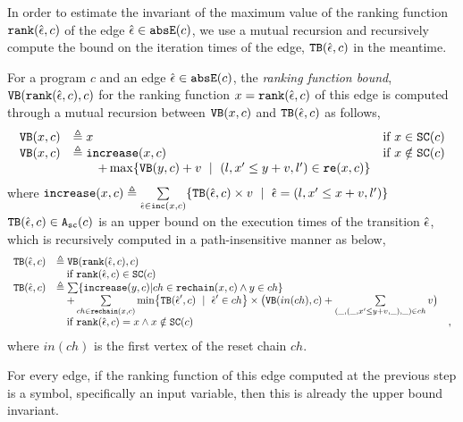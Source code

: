  In order to estimate the invariant of the maximum value of the ranking function $\mathtt{rank}(\hat{\mathtt{\epsilon}{}}, c)$
 of the edge $\hat{\mathtt{\epsilon}{}} \in \mathtt{abs}{\mathtt{E}}(c)$, we use a mutual recursion and recursively compute
 the bound on the iteration times of the edge, ${\mathtt{TB}}(\hat{\mathtt{\epsilon}{}}, c)$ in the meantime.
 \begin{defn}
 \label{def:ranking_bound}
 For a program $c$ and an edge $\hat{\mathtt{\epsilon}{}} \in \mathtt{abs}{\mathtt{E}}(c)$,
 the \emph{ranking function bound}, 
 ${\mathtt{VB}}(\mathtt{rank}(\hat{\mathtt{\epsilon}{}}, c), c)$ for the ranking function $x = \mathtt{rank}(\hat{\mathtt{\epsilon}{}}, c)$
 of this edge
 is computed through a mutual recursion between ${\mathtt{VB}}(x, c)$ and ${\mathtt{TB}}(\hat{\mathtt{\epsilon}{}}, c)$ as follows,
 \[ 
 \begin{array}{lll}
 \varinvar(x, c) & \triangleq x & \text{if} ~ x \in \scvar(c) \\
 \varinvar(x, c) & \triangleq \incrs(x, c) & \text{if} ~ x \notin \scvar(c) \\
 & \qquad + \max\left\{\varinvar(y, c) + v ~\mid~ (l, x' \leq y + v, l') \in \reset(x, c) \right\} &
 \end{array}
 \]
 where $\mathtt{increase}(x, c) \triangleq \sum\limits_{\hat{\mathtt{\epsilon}{}} \in \mathtt{inc}(x, c)}\{{\mathtt{TB}}(\hat{\mathtt{\epsilon}{}}, c) \times v ~\mid~ \hat{\mathtt{\epsilon}{}} = (l, x' \leq x + v, l')\}$
${\mathtt{TB}}(\hat{\mathtt{\epsilon}{}}, c) \in {\ensuremath{\mathtt{A_{sc}}}}(c)$ is an upper bound on the execution times of the transition $\hat{\mathtt{\epsilon}{}}$, which is recursively computed in a path-insensitive manner as below,
\[ 
\begin{array}{lll}
 \absclr(\absevent, c) 
 & \triangleq \varinvar(\rank(\absevent, c), c) & \\
 & \quad \text{if} ~ \rank(\absevent, c) \in \scvar(c) & \\
 \absclr(\absevent, c) 
 & \triangleq
 \sum \left\{ \incrs(y, c) | ch \in \resetchain(x, c) \land y \in ch \right\} & \\
 & \quad + 
 \sum\limits_{ch \in \resetchain(x, c)}
 \min \left\{\absclr(\absevent', c) ~\mid~ \absevent' \in ch\right\} \times 
 \big(\varinvar(in(ch), c) 
 + \sum\limits_{(\_, (\_, x' \leq y + v, \_), \_) \in ch} v \big) & \\
 & \quad \text{if} ~\rank(\absevent, c) = x \land x \notin \scvar(c) & ,
\end{array}
 \]
 where $in(ch)$ is the first vertex of the reset chain $ch$.
\end{defn}
 For every edge, if the ranking function of this edge computed at the previous step is a symbol, specifically an input variable, then this is already the upper bound invariant. 

